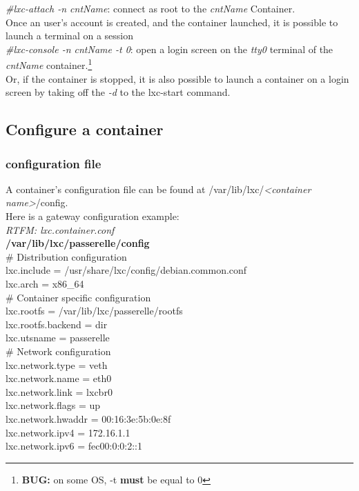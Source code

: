 \documentclass{article}
\begin{document}
\emph{\#lxc-attach -n cntName}: connect as root to the \emph{cntName} Container.\\
Once an user's account is created, and the container launched, it is possible to launch a terminal on a session\\

\emph{\#lxc-console -n cntName -t 0}: open a login screen on the \emph{tty0} terminal of the \emph{cntName} 
container.\footnote{\textbf{BUG:} on some OS, -t \textbf{must} be equal to 0}\\
Or, if the container is stopped, it is also possible to launch a container on a login screen by taking off the \emph{-d} to the lxc-start command.

\subsection{Configure a container}
\subsubsection{configuration file}
A container's configuration file can be found at /var/lib/lxc/\emph{<container name>}/config.\\
Here is a gateway configuration example:\\
\emph{RTFM: lxc.container.conf}\\

\noindent
\textbf{/var/lib/lxc/passerelle/config}\\

\noindent
\# Distribution configuration\\
lxc.include = /usr/share/lxc/config/debian.common.conf\\
lxc.arch = x86\_64\\

\noindent
\# Container specific configuration\\
lxc.rootfs = /var/lib/lxc/passerelle/rootfs\\
lxc.rootfs.backend = dir\\
lxc.utsname = passerelle\\

\noindent
\# Network configuration\\
lxc.network.type = veth\\
lxc.network.name = eth0\\
lxc.network.link = lxcbr0\\
lxc.network.flags = up\\
lxc.network.hwaddr = 00:16:3e:5b:0e:8f\\
lxc.network.ipv4 = 172.16.1.1\\
lxc.network.ipv6 = fec00:0:0:2::1\\
\end{document}
